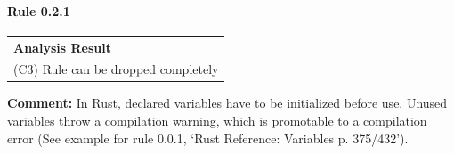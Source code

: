 \paragraph{Rule 0.2.1}
\begin{longtable}{p{13cm}}
\textbf{Analysis Result} \\
(C3) Rule can be dropped completely \\
\end{longtable}
\textbf{Comment:}  In Rust, declared variables have to be initialized before use. Unused variables throw a compilation warning, which is promotable to a compilation error (See example for rule 0.0.1, `Rust Reference: Variables p. 375/432'). \\
